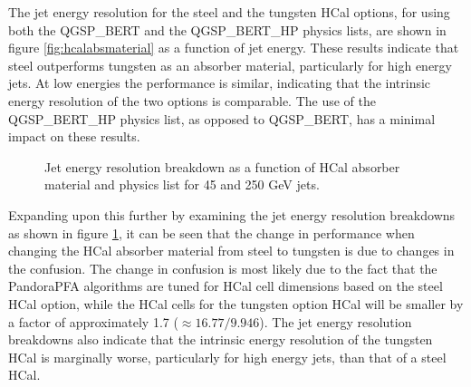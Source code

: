 The jet energy resolution for the steel and the tungsten HCal options, for using both the QGSP\_BERT and the QGSP\_BERT\_HP physics lists, are shown in figure \ref{fig:hcalabsmaterial} as a function of jet energy.  These results indicate that steel outperforms tungsten as an absorber material, particularly for high energy jets.  At low energies the performance is similar, indicating that the intrinsic energy resolution of the two options is comparable.  The use of the QGSP\_BERT\_HP physics list, as opposed to QGSP\_BERT, has a minimal impact on these results.

\begin{figure}
\centering
{}
\caption[Jet energy resolution breakdown as a function of HCal absorber material and physics list for 45 and 250 GeV jets.]{Jet energy resolution breakdown as a function of HCal absorber material and physics list for 45 and 250 GeV jets.}
\label{fig:hcalabsmaterialbreak}
\end{figure}

Expanding upon this further by examining the jet energy resolution breakdowns as shown in figure \ref{fig:hcalabsmaterialbreak}, it can be seen that the change in performance when changing the HCal absorber material from steel to tungsten is due to changes in the confusion.  The change in confusion is most likely due to the fact that the PandoraPFA algorithms are tuned for HCal cell dimensions based on the steel HCal option, while the HCal cells for the tungsten option HCal will be smaller by a factor of approximately 1.7 ($\approx 16.77/9.946$).  The jet energy resolution breakdowns also indicate that the intrinsic energy resolution of the tungsten HCal is marginally worse, particularly for high energy jets, than that of a steel HCal.  

